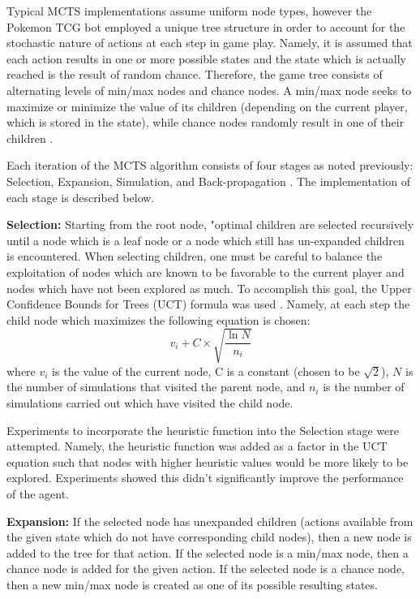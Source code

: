 \documentclass{article}
\begin{document}
Typical MCTS implementations assume uniform node types, however the Pokemon TCG bot employed a unique tree structure in order to account for the stochastic nature of actions at each step in game play. Namely, it is assumed that each action results in one or more possible states and the state which is actually reached is the result of random chance. Therefore, the game tree consists of alternating levels of min/max nodes and chance nodes. A min/max node seeks to maximize or minimize the value of its children (depending on the current player, which is stored in the state), while chance nodes randomly result in one of their children \cite{mcts2012}.


Each iteration of the MCTS algorithm consists of four stages as noted previously: Selection, Expansion, Simulation, and Back-propagation \cite{survey}. The implementation of each stage is described below. 

\textbf{Selection:} Starting from the root node, "optimal
 children are selected recursively until a node which is a leaf node or a node which still has un-expanded children is encountered. When selecting children, one must be careful to balance the exploitation of nodes which are known to be favorable to the current player and nodes which have not been explored as much. To accomplish this goal, the Upper Confidence Bounds for Trees (UCT) formula was used \cite{bandit}. Namely, at each step the child node which maximizes the following equation is chosen: $$v_i + C \times \sqrt{\frac{\ln N}{n_i}}$$ where $v_i$ is the value of the current node, C is a constant (chosen to be $\sqrt{2}$), $N$ is the number of simulations that visited the parent node, and $n_i$ is the number of simulations carried out which have visited the child node. 
 
Experiments to incorporate the heuristic function into the Selection stage were attempted. Namely, the heuristic function was added as a factor in the UCT equation such that nodes with higher heuristic values would be more likely to be explored. Experiments showed this didn't significantly improve the performance of the agent.
 
\textbf{Expansion: } If the selected node has unexpanded children (actions available from the given state which do not have corresponding child nodes), then a new node is added to the tree for that action. If the selected node is a min/max node, then a chance node is added for the given action. If the selected node is a chance node, then a new min/max node is created as one of its possible resulting states.
\end{document}
